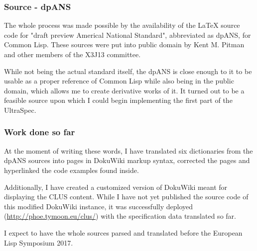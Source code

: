 \documentclass[11pt]{article}
\begin{document}
\subsubsection{Source - dpANS}
\label{sec:org9d3945a}
The whole process was made possible by the availability of the \LaTeX{} source code for "draft preview Americal National Standard", abbreviated as dpANS, for Common Lisp. These sources were put into public domain by Kent M. Pitman and other members of the X3J13 committee.

While not being the actual standard itself, the dpANS is close enough to it to be usable as a proper reference of Common Lisp while also being in the public domain, which allows me to create derivative works of it. It turned out to be a feasible source upon which I could begin implementing the first part of the UltraSpec.
\subsubsection{Work done so far}
\label{sec:org6b87d72}
At the moment of writing these words, I have translated six dictionaries from the dpANS sources into pages in DokuWiki markup syntax, corrected the pages and hyperlinked the code examples found inside.

Additionally, I have created a customized version of DokuWiki meant for displaying the CLUS content. While I have not yet published the source code of this modified DokuWiki instance, it was successfully deployed (\url{http://phoe.tymoon.eu/clus/}) with the specification data translated so far.

I expect to have the whole sources parsed and translated before the European Lisp Symposium 2017.
\end{document}
